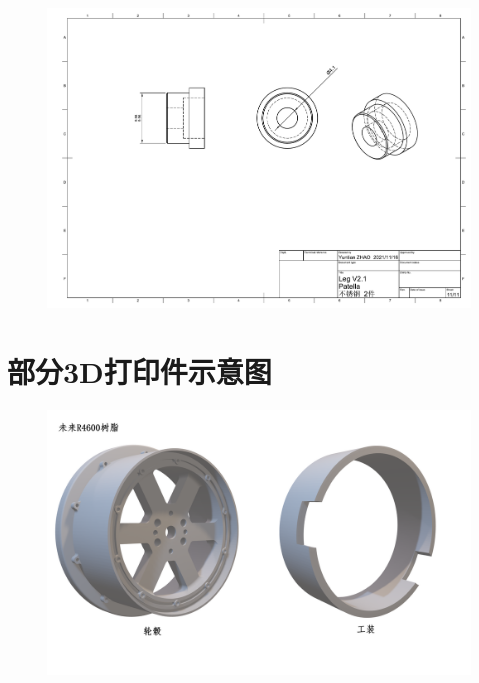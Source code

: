 \begin{figure}
  \centering
  \includegraphics[width=1.4\linewidth, angle=90]{figures/appendix/dwg11.pdf}
   \vspace{6pt}
\end{figure}

\clearpage

\section*{部分3D打印件示意图}

\begin{figure}[h!]
  \centering
  \includegraphics[width=1.4\linewidth, angle=90]{figures/appendix/3d1.png}
   \vspace{6pt}
\end{figure}

